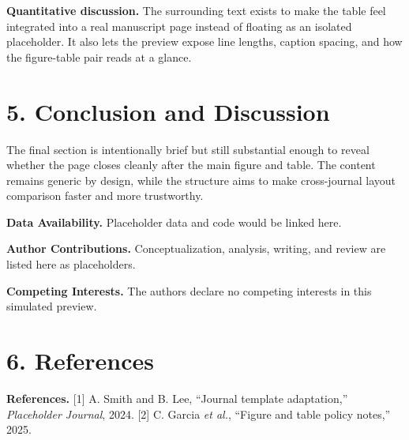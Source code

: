\documentclass[10pt,a4paper]{article}
\begin{document}
\textbf{Quantitative discussion.} The surrounding text exists to make the table feel integrated into a real manuscript page instead of floating as an isolated placeholder. It also lets the preview expose line lengths, caption spacing, and how the figure-table pair reads at a glance.

\section*{5. Conclusion and Discussion}
The final section is intentionally brief but still substantial enough to reveal whether the page closes cleanly after the main figure and table. The content remains generic by design, while the structure aims to make cross-journal layout comparison faster and more trustworthy.


\noindent \textbf{Data Availability.} Placeholder data and code would be linked here.\par
\noindent \textbf{Author Contributions.} Conceptualization, analysis, writing, and review are listed here as placeholders.\par
\noindent \textbf{Competing Interests.} The authors declare no competing interests in this simulated preview.\par
\section*{6. References}
\vspace{0.5em}
\noindent \textbf{References.} [1] A. Smith and B. Lee, ``Journal template adaptation,'' \textit{Placeholder Journal}, 2024. [2] C. Garcia \textit{et al.}, ``Figure and table policy notes,'' 2025.\par
\vspace{0.6em}
\end{document}
